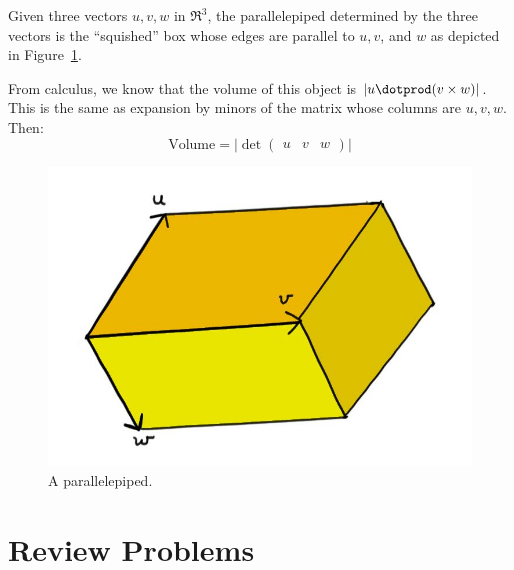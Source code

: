 Given three vectors $u,v,w$ in $\Re^3$, the parallelepiped determined by the three vectors is the ``squished'' box whose edges are parallel to $u, v$, and $w$ as depicted in Figure~\ref{parallelepiped}.

From calculus, we know that the volume of this object is $|u\dotprod (v\times w)|$.  This is the same as expansion by minors of the matrix whose columns are $u,v,w$.  Then:
\[
\text{Volume}=\big|\det \begin{pmatrix}u & v & w \end{pmatrix} \big|
\] 



\begin{figure}
\begin{center}
\includegraphics[scale=.4]{parallelepiped.jpg}
\caption{A parallelepiped.\label{parallelepiped}}
\end{center}
\end{figure}







\section{Review Problems}


\newpage





